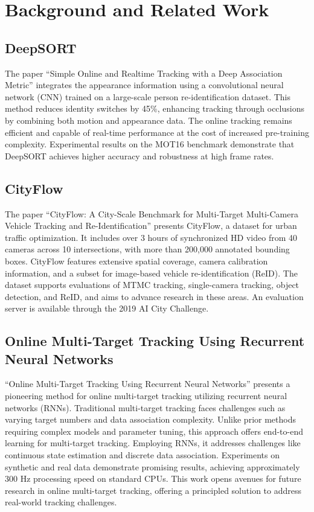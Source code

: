 \documentclass{article} %
\begin{document}
\section{Background and Related Work} \label{background}
\subsection{DeepSORT}
The paper ``Simple Online and Realtime Tracking with a Deep Association Metric'' \citep{wojke2017simple} integrates the appearance information using a convolutional neural network (CNN) trained on a large-scale person re-identification dataset. This method reduces identity switches by 45\%, enhancing tracking through occlusions by combining both motion and appearance data. The online tracking remains efficient and capable of real-time performance at the cost of increased pre-training complexity. Experimental results on the MOT16 benchmark demonstrate that DeepSORT achieves higher accuracy and robustness at high frame rates. 

\subsection{CityFlow}
The paper ``CityFlow: A City-Scale Benchmark for Multi-Target Multi-Camera Vehicle Tracking and Re-Identification'' \citep{tang2019cityflow} presents CityFlow, a dataset for urban traffic optimization. It includes over 3 hours of synchronized HD video from 40 cameras across 10 intersections, with more than 200,000 annotated bounding boxes. CityFlow features extensive spatial coverage, camera calibration information, and a subset for image-based vehicle re-identification (ReID). The dataset supports evaluations of MTMC tracking, single-camera tracking, object detection, and ReID, and aims to advance research in these areas. An evaluation server is available through the 2019 AI City Challenge. 
\subsection{Online Multi-Target Tracking Using Recurrent Neural Networks}
``Online Multi-Target Tracking Using Recurrent Neural Networks'' \citep{milan2016online} presents a pioneering method for online multi-target tracking utilizing recurrent neural networks (RNNs). Traditional multi-target tracking faces challenges such as varying target numbers and data association complexity. Unlike prior methods requiring complex models and parameter tuning, this approach offers end-to-end learning for multi-target tracking. Employing RNNs, it addresses challenges like continuous state estimation and discrete data association. Experiments on synthetic and real data demonstrate promising results, achieving approximately 300 Hz processing speed on standard CPUs. This work opens avenues for future research in online multi-target tracking, offering a principled solution to address real-world tracking challenges. 
\end{document}
